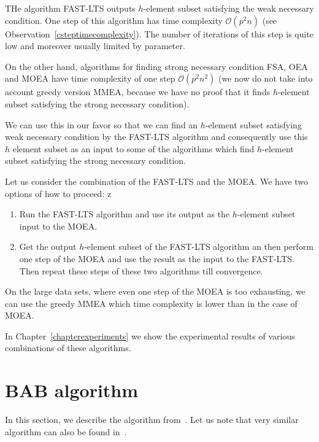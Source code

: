 THe algorithm FAST-LTS outputs $h$-element subset satisfying the weak necessary condition. One step of this algorithm has time complexity $\mathcal{O}(p^2n)$ (see Observation~\ref{csteptimecomplexity}). The number of iterations of this step is quite low and moreover usually limited by parameter. 

On the other hand, algorithms for finding strong necessary condition FSA, OEA and MOEA have time complexity of one step $\mathcal{O}(p^2n^2)$ (we now do not take into account greedy version MMEA, because we have no proof that it finds $h$-element subset satisfying the strong necessary condition). 

We can use this in our favor so that we can find an $h$-element subset satisfying weak necessary condition by the FAST-LTS algorithm and consequently use this $h$ element subset as an input to some of the algorithms which find $h$-element subset satisfying the strong necessary condition.

Let us consider the combination of the FAST-LTS and the MOEA. We have two options of how to proceed:
z
\begin{enumerate}
    \item Run the FAST-LTS algorithm and use its output as the $h$-element subset input to the MOEA.
    \item Get the output $h$-element subset of the FAST-LTS algorithm an then perform one step of the MOEA and use the result as the input to the FAST-LTS. Then repeat these steps of these two algorithms till convergence.
\end{enumerate}

On the large data sets, where even one step of the MOEA is too exhausting, we can use the greedy MMEA which time complexity is lower than in the case of MOEA.

In Chapter~\ref{chapterexperiments} we show the experimental results of various combinations of these algorithms.





\section{BAB algorithm} \label{sectionbab}
In this section, we describe the algorithm from~\cite{agullo2001new}. Let us note that very similar algorithm can also be found in~\cite{hofmann2010matrix}.

